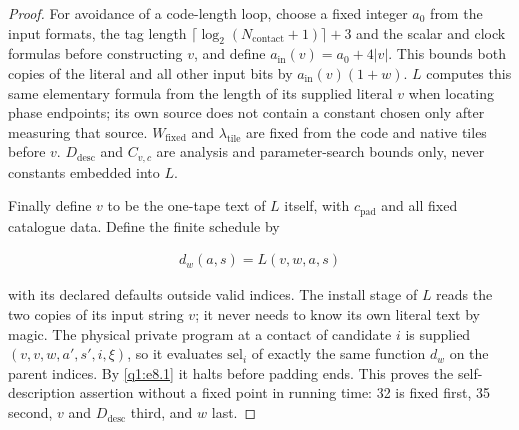 \begin{proof}
For avoidance of a code-length loop, choose a fixed integer \(a_{0}\) from the input formats, the tag length \(\lceil \log _{2}(N_{\mathrm{contact}}+1)\rceil+3\) and the scalar and clock formulas before constructing \(v\), and define \(a_{\mathrm{in}}(v)=a_{0}+4|v|\). This bounds both copies of the literal and all other input bits by \(a_{\mathrm{in}}(v)(1+w)\). \(L\) computes this same elementary formula from the length of its supplied literal \(v\) when locating phase endpoints; its own source does not contain a constant chosen only after measuring that source. \(W_{\mathrm{fixed}}\) and \(\lambda_{\mathrm{tile}}\) are fixed from the code and native tiles before \(v\). \(D_{\mathrm{desc}}\) and \(C_{v,c}\) are analysis and parameter-search bounds only, never constants embedded into \(L\).

Finally define \(v\) to be the one-tape text of \(L\) itself, with \(c_{\mathrm{pad}}\) and all fixed catalogue data. Define the finite schedule by

\[
\begin{gathered}
d_{w}(a,s)=L(v,w,a,s)
\end{gathered}
\]

with its declared defaults outside valid indices. The install stage of \(L\) reads the two copies of its input string \(v\); it never needs to know its own literal text by magic. The physical private program at a contact of candidate \(i\) is supplied \((v,v,w,a',s',i,\xi)\), so it evaluates \(\mathrm{sel}_{i}\) of exactly the same function \(d_{w}\) on the parent indices. By \eqref{q1:e8.1} it halts before padding ends. This proves the self-description assertion without a fixed point in running time: 32 is fixed first, 35 second, \(v\) and \(D_{\mathrm{desc}}\) third, and \(w\) last. 
\end{proof}




